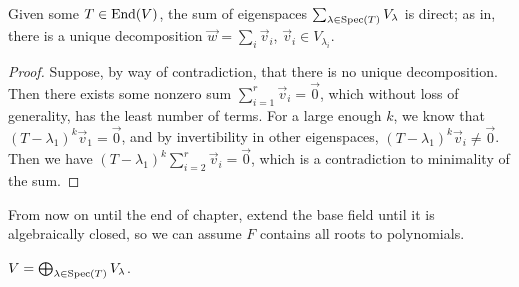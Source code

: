 \begin{lemma}\label{lem:eigenspace-direct-sum}
    Given some \(T \in \operatorname{End}(V)\),
    the sum of eigenspaces \(\sum_{\lambda\in\operatorname{Spec}(T)} V_\lambda\) is direct;
    as in, there is a unique decomposition \(\vec{w} = \sum_i \vec{v}_i\),
    \(\vec{v}_i \in V_{\lambda_i}\).
\end{lemma}
\begin{proof}
    Suppose, by way of contradiction,
    that there is no unique decomposition.
    Then there exists some nonzero sum \(\sum_{i=1}^r \vec{v}_i = \vec{0}\),
    which without loss of generality, has the least number of terms.
    For a large enough \(k\), we know that \({(T-\lambda_1)}^k\vec{v}_1 = \vec{0}\),
    and by invertibility in other eigenspaces, \({(T-\lambda_1)}^k\vec{v}_i \neq \vec{0}\).
    Then we have \({(T-\lambda_1)}^k \sum_{i=2}^r \vec{v}_i = \vec{0}\),
    which is a contradiction to minimality of the sum.
\end{proof}
\begin{remark}
    From now on until the end of chapter,
    extend the base field until it is algebraically closed,
    so we can assume \(F\) contains all roots to polynomials.
\end{remark}
\begin{theorem}\label{thm:spectral}
    \(V = \bigoplus_{\lambda\in\operatorname{Spec}(T)} V_{\lambda}\).
\end{theorem}
